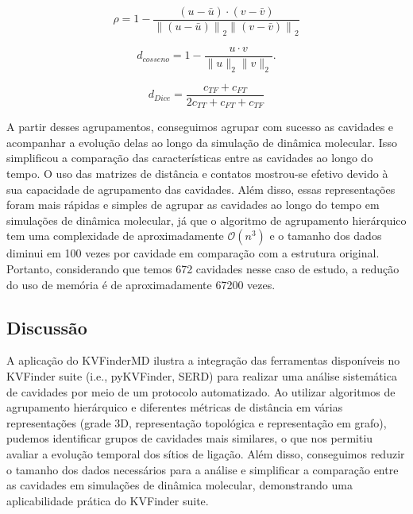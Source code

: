 \documentclass[Portugues]{phdquali}
\def\ie{i.e.\onedot}
\begin{document}
\begin{equation}
  \rho = 1 - \frac{(u - \bar{u}) \cdot (v - \bar{v})}{{\|(u - \bar{u})\|}_2 {\|(v - \bar{v})\|}_2}
  \label{eq:correlacao}
\end{equation}

\begin{equation}
  d_{cosseno} = 1 - \frac{u \cdot v}{\|u\|_2 \|v\|_2}.
  \label{eq:cosseno}
\end{equation}

\begin{equation}
  d_{Dice} = \frac{c_{TF} + c_{FT}}{2c_{TT} + c_{FT} + c_{TF}}
 \label{eq:dice}
\end{equation}

A partir desses agrupamentos, conseguimos agrupar com sucesso as cavidades e acompanhar a evolução delas ao longo da simulação de dinâmica molecular. Isso simplificou a comparação das características entre as cavidades ao longo do tempo. O uso das matrizes de distância e contatos mostrou-se efetivo devido à sua capacidade de agrupamento das cavidades. Além disso, essas representações foram mais rápidas e simples de agrupar as cavidades ao longo do tempo em simulações de dinâmica molecular, já que o algoritmo de agrupamento hierárquico tem uma complexidade de aproximadamente $\mathcal{O}(n^3)$ e o tamanho dos dados diminui em 100 vezes por cavidade em comparação com a estrutura original. Portanto, considerando que temos 672 cavidades nesse caso de estudo, a redução do uso de memória é de aproximadamente 67200 vezes.

\subsection{Discussão}

A aplicação do KVFinderMD ilustra a integração das ferramentas disponíveis no KVFinder suite (\ie, pyKVFinder, SERD) para realizar uma análise sistemática de cavidades por meio de um protocolo automatizado. Ao utilizar algoritmos de agrupamento hierárquico e diferentes métricas de distância em várias representações (grade 3D, representação topológica e representação em grafo), pudemos identificar grupos de cavidades mais similares, o que nos permitiu avaliar a evolução temporal dos sítios de ligação. Além disso, conseguimos reduzir o tamanho dos dados necessários para a análise e simplificar a comparação entre as cavidades em simulações de dinâmica molecular, demonstrando uma aplicabilidade prática do KVFinder suite.
\end{document}
